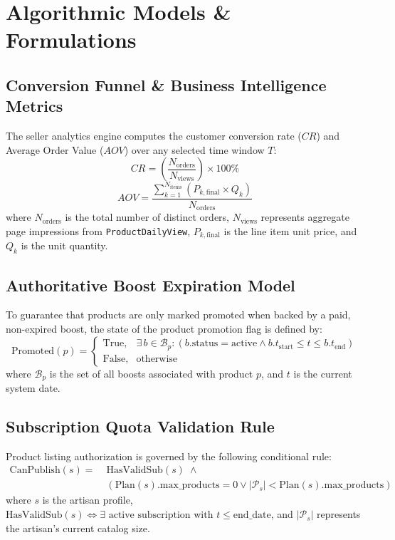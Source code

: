 \documentclass[12pt,a4paper]{article}
\begin{document}
\section{Algorithmic Models \& Formulations}

\subsection{Conversion Funnel \& Business Intelligence Metrics}
The seller analytics engine computes the customer conversion rate ($CR$) and Average Order Value ($AOV$) over any selected time window $T$:
\begin{equation}
    CR = \left( \frac{N_{\text{orders}}}{N_{\text{views}}} \right) \times 100\%
\end{equation}
\begin{equation}
    AOV = \frac{\sum_{k=1}^{N_{\text{items}}} \left( P_{k,\text{final}} \times Q_k \right)}{N_{\text{orders}}}
\end{equation}
where $N_{\text{orders}}$ is the total number of distinct orders, $N_{\text{views}}$ represents aggregate page impressions from \texttt{ProductDailyView}, $P_{k,\text{final}}$ is the line item unit price, and $Q_k$ is the unit quantity.

\subsection{Authoritative Boost Expiration Model}
To guarantee that products are only marked promoted when backed by a paid, non-expired boost, the state of the product promotion flag is defined by:
\begin{equation}
    \text{Promoted}(p) = 
    \begin{cases} 
        \text{True}, & \exists \, b \in \mathcal{B}_p : \left( b.\text{status} = \text{active} \land b.t_{\text{start}} \le t \le b.t_{\text{end}} \right) \\
        \text{False}, & \text{otherwise}
    \end{cases}
\end{equation}
where $\mathcal{B}_p$ is the set of all boosts associated with product $p$, and $t$ is the current system date.

\subsection{Subscription Quota Validation Rule}
Product listing authorization is governed by the following conditional rule:
\begin{equation}
    \begin{aligned}
        \text{CanPublish}(s) =\; &\text{HasValidSub}(s) \;\land \\
        &\left( \text{Plan}(s).\text{max\_products} = 0 \lor |\mathcal{P}_s| < \text{Plan}(s).\text{max\_products} \right)
    \end{aligned}
\end{equation}
where $s$ is the artisan profile, $\text{HasValidSub}(s) \iff \exists \text{ active subscription with } t \le \text{end\_date}$, and $|\mathcal{P}_s|$ represents the artisan's current catalog size.
\end{document}
